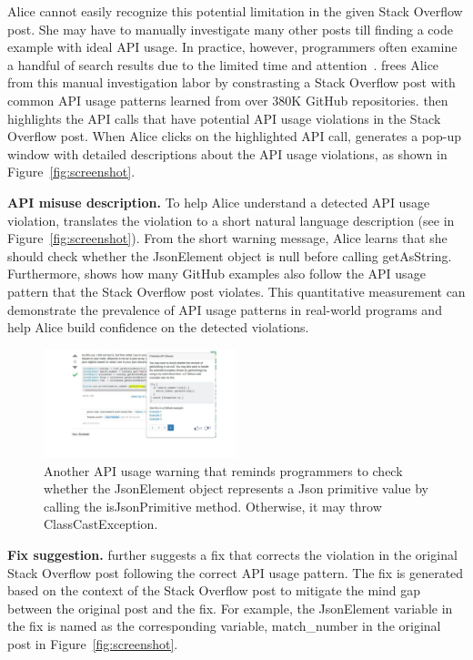 Alice cannot easily recognize this potential limitation in the given Stack Overflow post. She may have to manually investigate many other posts till finding a code example with ideal API usage. In practice, however, programmers often examine a handful of search results due to the limited time and attention~\cite{brandt2009two, starke2009working, duala2012asking}. {\tool} frees Alice from this manual investigation labor by constrasting a Stack Overflow post with common API usage patterns learned from over 380K GitHub repositories. {\tool} then highlights the API calls that have potential API usage violations in the Stack Overflow post. When Alice clicks on the highlighted API call, {\tool} generates a pop-up window with detailed descriptions about the API usage violations, as shown in Figure~\ref{fig:screenshot}.

{\bf API misuse description.} To help Alice understand a detected API usage violation, {\tool} translates the violation to a short natural language description (see  in Figure~\ref{fig:screenshot}). From  the short warning message, Alice learns that she should check whether the {\ttt JsonElement} object is null before calling {\ttt getAsString}. Furthermore, {\tool} shows how many GitHub examples also follow the API usage pattern that the Stack Overflow post violates. This quantitative measurement can demonstrate the prevalence of API usage patterns in real-world programs and help Alice build confidence on the detected violations.

\begin{figure}
\centering
\includegraphics[width=0.5\textwidth]{soap-v3-2.pdf}
  \vspace{.1in}
  \caption{Another API usage warning that reminds programmers to check whether the {\ttt JsonElement} object represents a Json primitive value by calling the {\ttt isJsonPrimitive} method. Otherwise, it may throw  {\ttt ClassCastException}.}
  \label{fig:screenshot2}
\end{figure}

{\bf Fix suggestion.} {\tool} further suggests a fix that corrects the violation in the original Stack Overflow post following the correct API usage pattern. The fix is generated based on the context of the Stack Overflow post to mitigate the mind gap between the original post and the fix. For example, the {\ttt JsonElement} variable in the fix is named as the corresponding variable, {\ttt match\_number} in the original post in Figure~\ref{fig:screenshot}. 

